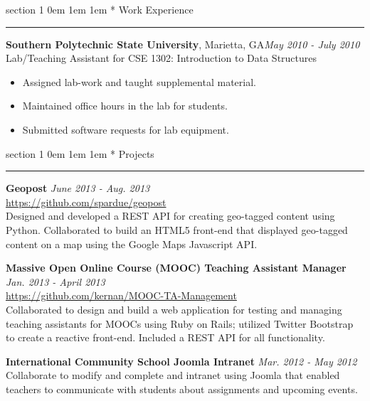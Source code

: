 \documentclass{article}
\makeatletter
\renewcommand{\section}[1]{
	\vspace{0.75em}
	\@startsection
	{section}
	{1}
	{\z@}
	{0em}
	{1em \@minus 1em} %
	{\normalfont\large\sc\bfseries}
	*
	{#1}
	\vspace{-0.75em} %
	\hrule
	\par
}
\newcommand{\entry}[1]{\def \@entry {#1}}
\newcommand{\dates}[1]{\def \@dates {#1}}
\newenvironment{datedentry}{
	\vspace{0.5em}
	{\bf \@entry} \hfill {\it \@dates} \\
}{}
\newcommand{\location}[1]{\def \@location {#1}}
\newenvironment{locationentry}{
	\vspace{0.5em}
	{\bf \@entry}, \@location \hfill {\it \@dates} \\
}{}
\makeatother
\begin{document}
\section{Work Experience}
\entry{Southern Polytechnic State University}
\location{Marietta, GA}
\dates{May 2010 - July 2010}
\begin{locationentry}
	Lab/Teaching Assistant for CSE 1302: Introduction to Data Structures
	\begin{itemize}
		\item Assigned lab-work and taught supplemental material.
		\item Maintained office hours in the lab for students.
		\item Submitted software requests for lab equipment.
	\end{itemize}
\end{locationentry}

\section{Projects}

\entry{Geopost}
\dates{June 2013 - Aug. 2013}
\begin{datedentry}
	\url{https://github.com/spardue/geopost} \\
	Designed and developed a REST API for creating geo-tagged content using
	Python.  Collaborated to build an HTML5 front-end that displayed geo-tagged
	content on a map using the Google Maps Javascript API.
\end{datedentry}

\entry{Massive Open Online Course (MOOC) Teaching Assistant Manager}
\dates{Jan. 2013 - April 2013}
\begin{datedentry}
	\url{https://github.com/kernan/MOOC-TA-Management} \\
	Collaborated to design and build a web application for testing and managing
	teaching assistants for MOOCs using Ruby on Rails; utilized Twitter
	Bootstrap to create a reactive front-end. Included a REST API for all
	functionality.
\end{datedentry}

\entry{International Community School Joomla Intranet}
\dates{Mar. 2012 - May 2012}
\begin{datedentry}
	Collaborate to modify and complete and intranet using Joomla that enabled
	teachers to communicate with students about assignments and upcoming events.
\end{datedentry}
\end{document}

